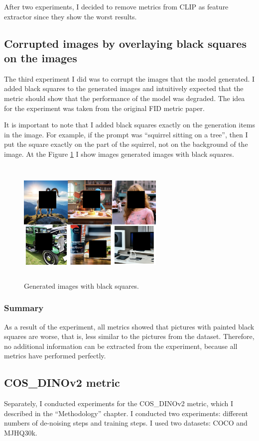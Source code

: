 After two experiments, I decided to remove metrics from CLIP as feature extractor since they show the worst results.

\subsection{Corrupted images by overlaying black squares on the images}
The third experiment I did was to corrupt the images that the model generated. I added black squares to the generated images and intuitively expected that the metric should show that the performance of the model was degraded. The idea for the experiment was taken from the original FID metric paper\cite{FID}.


It is important to note that I added black squares exactly on the generation items in the image. For example, if the prompt was “squirrel sitting on a tree”, then I put the square exactly on the part of the squirrel, not on the background of the image. At the Figure \ref{fig:images_with_black_squares} I show images generated images with black squares.

\begin{figure}[]
\centering
\includegraphics[width=7cm, height=6cm]{figs/images_with_black_squares.png}
\caption{Generated images with black squares.}
\label{fig:images_with_black_squares}
\end{figure}

\subsubsection{Summary}
As a result of the experiment, all metrics showed that pictures with painted black squares are worse, that is, less similar to the pictures from the dataset. Therefore, no additional information can be extracted from the experiment, because all metrics have performed perfectly.

\subsection{COS\_DINOv2 metric}
Separately, I conducted experiments for the COS\_DINOv2 metric, which I described in the “Methodology” chapter. I conducted two experiments: different numbers of de-noising steps and training steps. I used two datasets: COCO and MJHQ30k.

